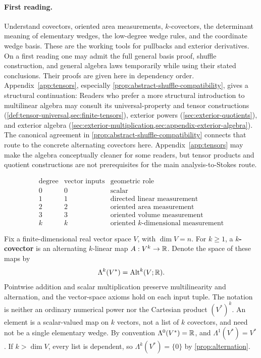 \paragraph{First reading.}
Understand covectors, oriented area measurements,
$k$-covectors, the determinant meaning of elementary wedges, the low-degree
wedge rules, and the coordinate wedge basis. These are the working tools
for pullbacks and exterior derivatives. On a first reading one may admit
the full general basis proof, shuffle construction, and general algebra
laws temporarily while using their stated conclusions. Their proofs are
given here in dependency order. Appendix~\ref{app:tensors}, especially
\cref{prop:abstract-shuffle-compatibility}, gives a structural continuation:
Readers who prefer a more structural introduction to multilinear algebra
may consult its universal-property and tensor constructions
(\cref{def:tensor-universal,sec:finite-tensors}), exterior powers
(\cref{sec:exterior-quotients}), and exterior algebra
(\cref{sec:exterior-multiplication,sec:appendix-exterior-algebra}).
The canonical agreement in \cref{prop:abstract-shuffle-compatibility}
connects that route to the concrete alternating covectors here.
Appendix~\ref{app:tensors} may make the algebra conceptually cleaner for some readers,
but tensor products and quotient constructions are not prerequisites for
the main analysis-to-Stokes route.

\[
\begin{array}{c|c|l}
\text{degree}&\text{vector inputs}&\text{geometric role}\\\hline
0&0&\text{scalar}\\
1&1&\text{directed linear measurement}\\
2&2&\text{oriented area measurement}\\
3&3&\text{oriented volume measurement}\\
k&k&\text{oriented $k$-dimensional measurement}
\end{array}
\]

\begin{definition}\label{def:exterior-covectors}
Fix a finite-dimensional real vector space $V$, with $\dim V=n$.
For $k\geq1$, a \textbf{$k$-covector} is an alternating $k$-linear map
$A:V^k\to\mathbb{R}$. Denote the space of these maps by
\[
\Lambda^k(V^*)=\operatorname{Alt}^k(V;\mathbb{R}).
\]
Pointwise addition and scalar multiplication preserve multilinearity and
alternation, and the vector-space axioms hold on each input tuple.
The notation is neither an ordinary numerical power nor the Cartesian
product $(V^*)^k$. An element is a scalar-valued map on $k$ vectors,
not a list of $k$ covectors, and need not be a single elementary wedge.
By convention
$\Lambda^0(V^*)=\mathbb{R}$, and $\Lambda^1(V^*)=V^*$.
If $k>\dim V$, every list is dependent, so
$\Lambda^k(V^*)=\{0\}$ by \cref{prop:alternation}.
\end{definition}

